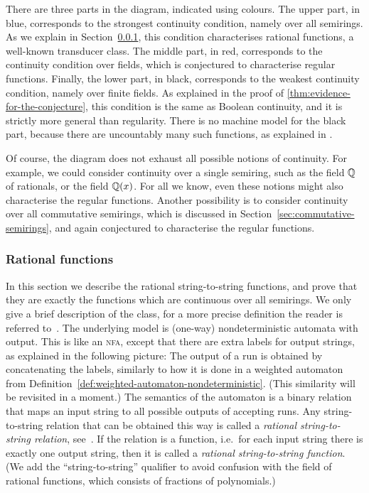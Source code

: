 There are three parts in the diagram, indicated using colours. The upper part, in blue, corresponds to the strongest continuity condition, namely over all semirings. As we explain in Section~\ref{sec:rational-functions}, this condition characterises rational functions, a well-known transducer class. The middle part, in red, corresponds to the continuity condition over fields, which is conjectured to characterise regular functions. Finally, the lower part, in black, corresponds to the weakest continuity condition, namely over finite fields. As explained in the proof of \cref{thm:evidence-for-the-conjecture}, this condition is the same as Boolean continuity, and it is strictly more general than regularity. There is no machine model for the black part, because there are uncountably many such functions, as explained in \cite{bojanczykTitoRegular23}.

Of course, the diagram does not exhaust all possible notions of continuity. For example, we could consider continuity over a single semiring, such as the field ${\mathbb Q}$ of rationals, or the field ${\mathbb Q}(x)$. For all we know, even these notions might also characterise the regular functions. Another possibility is to consider continuity over all commutative semirings, which is discussed in Section~\ref{sec:commutative-semirings}, and again conjectured to characterise the regular functions.

\subsubsection{Rational functions}
\label{sec:rational-functions}
In this section we describe the rational string-to-string functions, and prove that they are exactly the functions which are continuous over all semirings.  We only give a brief description of the class, for a more precise definition the reader is referred to~\cite[Section 14.2]{bojanczyk_automata_2025}. The underlying model is (one-way) nondeterministic automata with output. This is like an \textsc{nfa}, except that there are extra labels for output strings, as  explained in the following picture: 
The output of a run is obtained by concatenating the labels, similarly to how it is done in a weighted automaton from Definition~\ref{def:weighted-automaton-nondeterministic}. (This similarity will be revisited in a moment.) The semantics of the automaton is a binary relation that maps an input string to all possible outputs of accepting runs. Any string-to-string relation that can be obtained this way is called a \emph{rational string-to-string relation}, see~\cite[Chapter IX]{Eilenberg74}. If the relation is a function, i.e.~for each input string there is exactly one output string, then it is called a \emph{rational string-to-string function}. (We add the ``string-to-string'' qualifier to avoid confusion with the field  of rational functions, which consists of fractions of polynomials.)  

